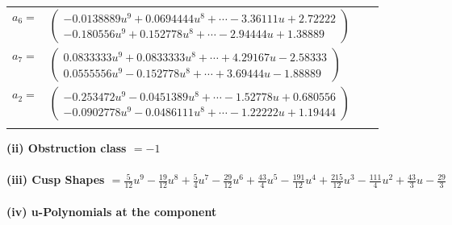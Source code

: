 \documentclass[1p]{elsarticle_modified}
\theoremstyle{definition}
\begin{document}
\begin{tabular}{m{7pt} m{180pt} m{7pt} m{180pt} }
\flushright $a_{6}=$&$\begin{pmatrix}-0.0138889 u^{9}+0.0694444 u^{8}+\cdots-3.36111 u+2.72222\\-0.180556 u^{9}+0.152778 u^{8}+\cdots-2.94444 u+1.38889\end{pmatrix}$ \\
\flushright $a_{7}=$&$\begin{pmatrix}0.0833333 u^{9}+0.0833333 u^{8}+\cdots+4.29167 u-2.58333\\0.0555556 u^{9}-0.152778 u^{8}+\cdots+3.69444 u-1.88889\end{pmatrix}$ \\
\flushright $a_{2}=$&$\begin{pmatrix}-0.253472 u^{9}-0.0451389 u^{8}+\cdots-1.52778 u+0.680556\\-0.0902778 u^{9}-0.0486111 u^{8}+\cdots-1.22222 u+1.19444\end{pmatrix}$\\&\end{tabular}
\flushleft \textbf{(ii) Obstruction class $= -1$}\\~\\
\flushleft \textbf{(iii) Cusp Shapes $= \frac{5}{12} u^9-\frac{19}{12} u^8+\frac{5}{4} u^7-\frac{29}{12} u^6+\frac{43}{4} u^5-\frac{191}{12} u^4+\frac{215}{12} u^3-\frac{111}{4} u^2+\frac{43}{3} u-\frac{29}{3}$}\\~\\
\newpage\renewcommand{\arraystretch}{1}
\flushleft \textbf{(iv) u-Polynomials at the component}\newline \\
\end{document}
